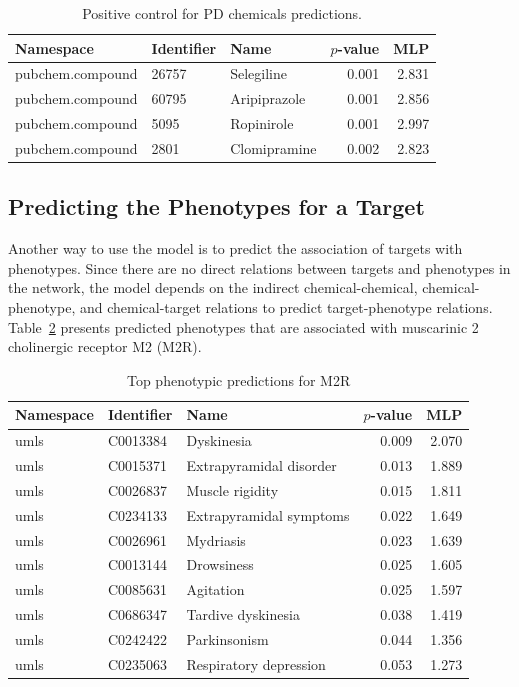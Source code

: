 \begin{table}
\centering
\begin{tabular}{|l|l|l|r|r|}
\hline
 \textbf{Namespace} & \textbf{Identifier} & \textbf{Name} & \textbf{$p$-value} & \textbf{MLP} \\
\hline
pubchem.compound & 26757 & Selegiline & 0.001 & 2.831 \\
\hline
pubchem.compound & 60795 &  Aripiprazole &  0.001 &  2.856 \\
\hline
pubchem.compound & 5095 & Ropinirole &  0.001 &  2.997 \\
\hline
pubchem.compound & 2801 & Clomipramine &  0.002 &  2.823 \\
\hline
\end{tabular}
 \caption{Positive control for PD chemicals predictions.}
    \label{tab:ps_PD}
\end{table}

\subsection{Predicting the Phenotypes for a Target }
Another way to use the model is to predict the association of targets with phenotypes.
Since there are no direct relations between targets and phenotypes in the network, the model depends on the indirect chemical-chemical, chemical-phenotype, and chemical-target relations to predict target-phenotype relations.
Table~\ref{tab:target_phenotype} presents predicted phenotypes that are associated with muscarinic 2 cholinergic receptor M2 (M2R).

\begin{table}[h]
    \centering
    \begin{tabular}{ |l|l|l|r|r| }
        \hline
        \textbf{Namespace} & \textbf{Identifier} & \textbf{Name} & \textbf{$p$-value} & \textbf{MLP} \\
        \hline
        umls & C0013384 & Dyskinesia &  0.009 &  2.070 \\
        \hline
        umls & C0015371 & Extrapyramidal disorder &  0.013 &  1.889 \\
        \hline
        umls & C0026837 & Muscle rigidity &  0.015 &  1.811 \\
        \hline
        umls & C0234133 & Extrapyramidal symptoms &  0.022 &  1.649 \\
        \hline
        umls &  C0026961 & Mydriasis &  0.023 &  1.639 \\
        \hline
        umls & C0013144 & Drowsiness &  0.025 &  1.605 \\
        \hline
        umls &  C0085631 & Agitation &  0.025 &  1.597 \\
        \hline
        umls &  C0686347 & Tardive dyskinesia &  0.038 &  1.419 \\
        \hline
        umls &  C0242422 & Parkinsonism &  0.044 &  1.356 \\
        \hline
        umls &  C0235063 & Respiratory depression &  0.053 &  1.273 \\
        \hline
    \end{tabular}
    \caption{Top phenotypic predictions for M2R}
    \label{tab:target_phenotype}
\end{table}

